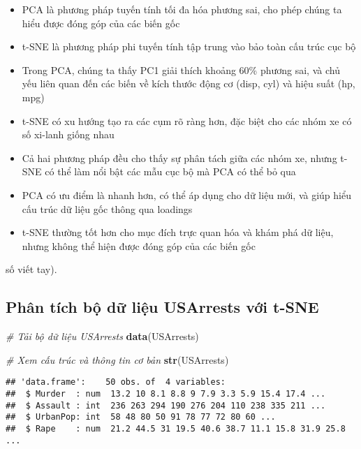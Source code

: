 \documentclass[
]{article}
\newenvironment{Shaded}{\begin{snugshade}}{\end{snugshade}}
\newcommand{\CommentTok}[1]{\textcolor[rgb]{0.56,0.35,0.01}{\textit{#1}}}
\newcommand{\FunctionTok}[1]{\textcolor[rgb]{0.13,0.29,0.53}{\textbf{#1}}}
\newcommand{\NormalTok}[1]{#1}
\providecommand{\tightlist}{%
  \setlength{\itemsep}{0pt}\setlength{\parskip}{0pt}}
\begin{document}
\begin{itemize}
\tightlist
\item
  PCA là phương pháp tuyến tính tối đa hóa phương sai, cho phép chúng ta
  hiểu được đóng góp của các biến gốc
\item
  t-SNE là phương pháp phi tuyến tính tập trung vào bảo toàn cấu trúc
  cục bộ
\item
  Trong PCA, chúng ta thấy PC1 giải thích khoảng 60\% phương sai, và chủ
  yếu liên quan đến các biến về kích thước động cơ (disp, cyl) và hiệu
  suất (hp, mpg)
\item
  t-SNE có xu hướng tạo ra các cụm rõ ràng hơn, đặc biệt cho các nhóm xe
  có số xi-lanh giống nhau
\item
  Cả hai phương pháp đều cho thấy sự phân tách giữa các nhóm xe, nhưng
  t-SNE có thể làm nổi bật các mẫu cục bộ mà PCA có thể bỏ qua
\item
  PCA có ưu điểm là nhanh hơn, có thể áp dụng cho dữ liệu mới, và giúp
  hiểu cấu trúc dữ liệu gốc thông qua loadings
\item
  t-SNE thường tốt hơn cho mục đích trực quan hóa và khám phá dữ liệu,
  nhưng không thể hiện được đóng góp của các biến gốc
\end{itemize}

số viết tay).

\subsection{Phân tích bộ dữ liệu USArrests với
t-SNE}\label{phuxe2n-tuxedch-bux1ed9-dux1eef-liux1ec7u-usarrests-vux1edbi-t-sne}

\begin{Shaded}
\begin{Highlighting}[]
\CommentTok{\# Tải bộ dữ liệu USArrests}
\FunctionTok{data}\NormalTok{(USArrests)}

\CommentTok{\# Xem cấu trúc và thông tin cơ bản}
\FunctionTok{str}\NormalTok{(USArrests)}
\end{Highlighting}
\end{Shaded}

\begin{verbatim}
## 'data.frame':    50 obs. of  4 variables:
##  $ Murder  : num  13.2 10 8.1 8.8 9 7.9 3.3 5.9 15.4 17.4 ...
##  $ Assault : int  236 263 294 190 276 204 110 238 335 211 ...
##  $ UrbanPop: int  58 48 80 50 91 78 77 72 80 60 ...
##  $ Rape    : num  21.2 44.5 31 19.5 40.6 38.7 11.1 15.8 31.9 25.8 ...
\end{verbatim}
\end{document}
